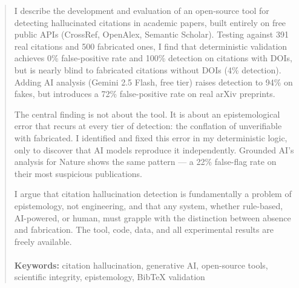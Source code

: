 \begin{abstract}
\noindent    
I describe the development and evaluation of an open-source tool for detecting hallucinated citations in academic papers, built entirely on free public APIs (CrossRef, OpenAlex, Semantic Scholar). Testing against 391 real citations and 500 fabricated ones, I find that deterministic validation achieves 0\% false-positive rate and 100\% detection on citations with DOIs, but is nearly blind to fabricated citations without DOIs (4\% detection). Adding AI analysis (Gemini 2.5 Flash, free tier) raises detection to 94\% on fakes, but introduces a 72\% false-positive rate on real arXiv preprints.

The central finding is not about the tool. It is about an epistemological error that recurs at every tier of detection: the conflation of unverifiable with fabricated. I identified and fixed this error in my deterministic logic, only to discover that AI models reproduce it independently. Grounded AI's analysis for Nature shows the same pattern — a 22\% false-flag rate on their most suspicious publications.

I argue that citation hallucination detection is fundamentally a problem of epistemology, not engineering, and that any system, whether rule-based, AI-powered, or human, must grapple with the distinction between absence and fabrication. The tool, code, data, and all experimental results are freely available.
\\\\   
\smallskip
\noindent\textbf{Keywords:} citation hallucination, generative AI, open-source tools, scientific integrity, epistemology, BibTeX validation
\end{abstract}